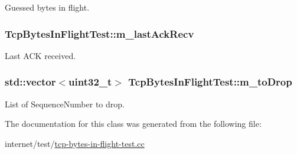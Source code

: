 Guessed bytes in flight. 

\subsubsection[{\texorpdfstring{m\+\_\+last\+Ack\+Recv}{m_lastAckRecv}}]{ Tcp\+Bytes\+In\+Flight\+Test\+::m\+\_\+last\+Ack\+Recv\hspace{0.3cm}{\ttfamily [private]}}\hypertarget{classTcpBytesInFlightTest_a69ac0a58e163339be5082e44e0e74abe}{}\label{classTcpBytesInFlightTest_a69ac0a58e163339be5082e44e0e74abe}


Last A\+CK received. 

\subsubsection[{\texorpdfstring{m\+\_\+to\+Drop}{m_toDrop}}]{\setlength{\rightskip}{0pt plus 5cm}std\+::vector$<$uint32\+\_\+t$>$ Tcp\+Bytes\+In\+Flight\+Test\+::m\+\_\+to\+Drop\hspace{0.3cm}{\ttfamily [private]}}\hypertarget{classTcpBytesInFlightTest_a07a49022311b5cede6d01eef26ba3f33}{}\label{classTcpBytesInFlightTest_a07a49022311b5cede6d01eef26ba3f33}


List of Sequence\+Number to drop. 



The documentation for this class was generated from the following file\+:\begin{DoxyCompactItemize}
\item 
internet/test/\hyperlink{tcp-bytes-in-flight-test_8cc}{tcp-\/bytes-\/in-\/flight-\/test.\+cc}\end{DoxyCompactItemize}
